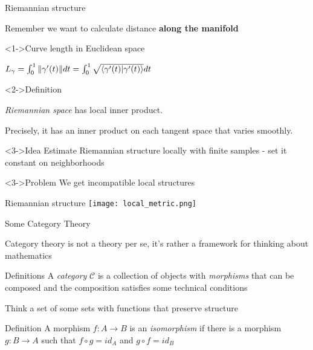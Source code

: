 \documentclass[unknownkeysallowed]{beamer}
\begin{document}
\begin{frame}{Riemannian structure}

	Remember we want to calculate distance \textbf{along the manifold} 

	\begin{block}<1->{Curve length in Euclidean space}

	$L_\gamma = \int_{0}^{1} \|\gamma'(t)\| dt =  \int_{0}^{1} \sqrt{\braket{\gamma'(t) | \gamma'(t)}} dt$

	\end{block}

	\begin{block}<2->{Definition}

	\textit{Riemannian space} has local inner product.

	Precisely, it has an inner product on each tangent space that varies smoothly.
	\end{block}

	\begin{block}<3->{Idea}
	Estimate Riemannian structure locally with finite samples - set it constant on neighborhoods
	\end{block}
	
	\begin{alertblock}<3->{Problem}
	We get incompatible local structures
	\end{alertblock}
\end{frame}

\begin{frame}{Riemannian structure}
	\texttt{[image: local\_metric.png]}
\end{frame}


\begin{frame}{Some Category Theory}

	Category theory is not a theory per se, it's rather a framework for thinking about mathematics

	\begin{block}{Definitions}
	A \textit{category} $\mathcal{C}$ is a collection of objects with \textit{morphisms} that can be composed and the composition satisfies some technical conditions

	\end{block}

	Think a set of some sets with functions that preserve structure

	\begin{block}{Definition}
	A morphism $f: A \to B$ is an \textit{isomorphism} if there is a morphism $g: B \to A$ such that $f \circ g = id_A$ and $g \circ f = id_B$
	\end{block}

\end{frame}
\end{document}
